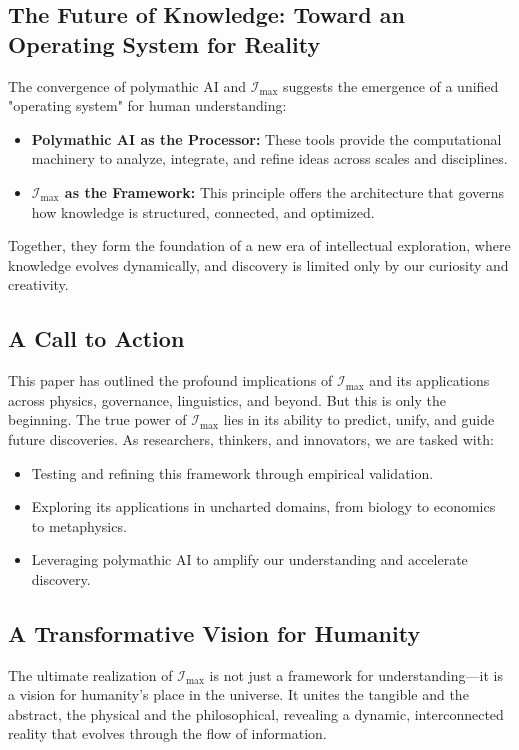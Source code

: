 \documentclass[12pt]{article}
\begin{document}
\subsection{The Future of Knowledge: Toward an Operating System for Reality}
The convergence of polymathic AI and \(\mathcal{I}_{\text{max}}\) suggests the emergence of a unified "operating system" for human understanding:
\begin{itemize}
    \item \textbf{Polymathic AI as the Processor:} These tools provide the computational machinery to analyze, integrate, and refine ideas across scales and disciplines.
    \item \textbf{\(\mathcal{I}_{\text{max}}\) as the Framework:} This principle offers the architecture that governs how knowledge is structured, connected, and optimized.
\end{itemize}

Together, they form the foundation of a new era of intellectual exploration, where knowledge evolves dynamically, and discovery is limited only by our curiosity and creativity.

\subsection{A Call to Action}
This paper has outlined the profound implications of \(\mathcal{I}_{\text{max}}\) and its applications across physics, governance, linguistics, and beyond. But this is only the beginning. The true power of \(\mathcal{I}_{\text{max}}\) lies in its ability to predict, unify, and guide future discoveries. As researchers, thinkers, and innovators, we are tasked with:
\begin{itemize}
    \item Testing and refining this framework through empirical validation.
    \item Exploring its applications in uncharted domains, from biology to economics to metaphysics.
    \item Leveraging polymathic AI to amplify our understanding and accelerate discovery.
\end{itemize}

\subsection{A Transformative Vision for Humanity}
The ultimate realization of \(\mathcal{I}_{\text{max}}\) is not just a framework for understanding—it is a vision for humanity’s place in the universe. It unites the tangible and the abstract, the physical and the philosophical, revealing a dynamic, interconnected reality that evolves through the flow of information.
\end{document}

